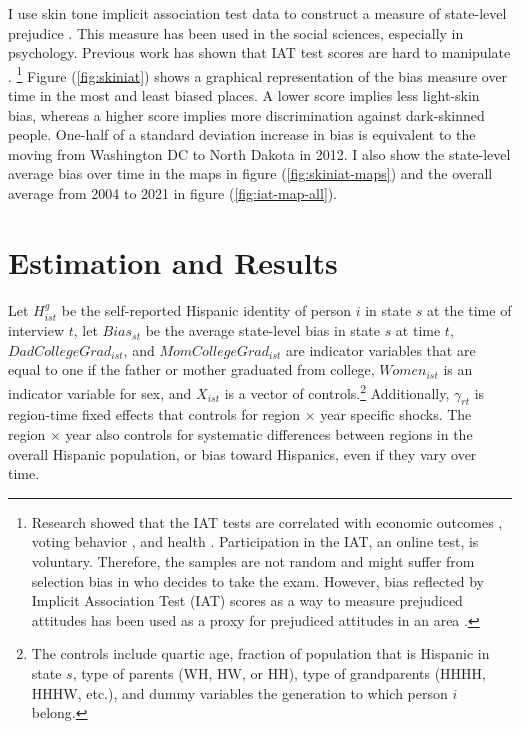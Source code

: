 \documentclass[12pt,english]{article}
\begin{document}
I use skin tone implicit association test data to construct a measure of state-level prejudice \autocite{greenwaldMeasuringIndividualDifferences1998}. This measure has been used in the social sciences, especially in psychology. Previous work has shown that IAT test scores are hard to manipulate \autocite{egloffPredictiveValidityImplicit2002}. \footnote{Research showed that the IAT tests are correlated with economic outcomes \autocite{chettyRaceEconomicOpportunity2020,gloverDiscriminationSelfFulfillingProphecy2017}, voting behavior \autocite{friesePredictingVotingBehavior2007}, and health \autocite{leitnerRacialBiasAssociated2016}. Participation in the IAT, an online test, is voluntary. Therefore, the samples are not random and might suffer from selection bias in who decides to take the exam. However,  bias reflected by Implicit Association Test (IAT) scores as a way to measure prejudiced attitudes has been used as a proxy for prejudiced attitudes in an area \textcite{chettyRaceEconomicOpportunity2020}.} Figure (\ref{fig:skiniat}) shows a graphical representation of the bias measure over time in the most and least biased places. A lower score implies less light-skin bias, whereas a higher score implies more discrimination against dark-skinned people. One-half of a standard deviation increase in bias is equivalent to the moving from Washington DC to North Dakota in 2012. I also show the state-level average bias over time in the maps in figure (\ref{fig:skiniat-maps}) and the overall average from 2004 to 2021 in figure (\ref{fig:iat-map-all}).


\section{Estimation and Results}\label{sec:empstrat}

Let $H_{ist}^g$ be the self-reported Hispanic identity of person $i$ in state $s$ at the time of interview $t$, let $Bias_{st}$ be the average state-level bias in state $s$ at time $t$, $DadCollegeGrad_{ist}$, and $MomCollegeGrad_{ist}$ are indicator variables that are equal to one if the father or mother graduated from college, $Women_{ist}$ is an indicator variable for sex, and $X_{ist}$ is a vector of controls.\footnote{The controls include quartic age, fraction of population that is Hispanic in state $s$, type of parents (WH, HW, or HH), type of grandparents (HHHH, HHHW, etc.), and dummy variables the generation to which person $i$ belong.} Additionally, $\gamma_{rt}$ is region-time fixed effects that controls for region $\times$ year specific shocks. The region $\times$ year also controls for systematic differences between regions in the overall Hispanic population, or bias toward Hispanics, even if they vary over time.
\end{document}
